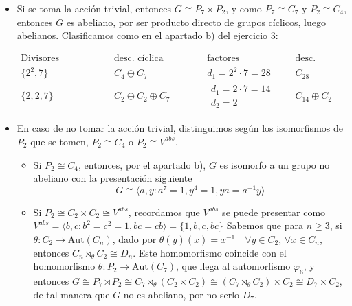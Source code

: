\documentclass[12pt]{article}
\newcommand{\Aut}{\text{Aut}}
\begin{document}
\begin{ejercicio}[2 puntos]
\begin{enumerate}[label=(\alph*)]
            \begin{itemize}
                \item Si se toma la acción trivial, entonces $G \cong P_7 \times P_2$, y como $P_7 \cong C_7$ y $P_2 \cong C_4$, entonces $G$ es abeliano, por ser producto directo de grupos cíclicos, luego abelianos. Clasificamos como en el apartado b) del ejercicio 3:
                
                \begin{equation*}
                    \begin{array}{c|c|c|c}
                        \text{Divisores elementales} & \text{desc. cíclica primaria} & \text{factores invariantes} & \text{desc. cíclica} \\
                        \hline
                        \{2^2, 7\} & C_4 \oplus C_{7} & d_1 = 2^2\cdot 7 = 28 & C_{28} \\
                        \hline
                        \{2, 2, 7\} & C_2\oplus C_2\oplus C_7 & \begin{array}{c}
                                d_1 = 2 \cdot 7 = 14 \\
                                d_2 = 2
                        \end{array}& C_{14}\oplus C_2
                    \end{array}
                \end{equation*}
                \item En caso de no tomar la acción trivial, distinguimos según los isomorfismos de $P_2$ que se tomen, $P_2 \cong C_4$ o $P_2 \cong V^{abs}$.
                \begin{itemize}
                    \item Si $P_2 \cong C_4$, entonces, por el apartado b), $G$ es isomorfo a un grupo no abeliano con la presentación siguiente $$G \cong \langle a,y : a^7 = 1,  y^4 = 1, ya = a^{-1}y \rangle$$
                    \item Si $P_2 \cong C_2 \times C_2 \cong V^{abs}$, recordamos que $V^{abs}$ se puede presentar como $V^{abs} = \langle b,c : b^2 = c^2 = 1, bc = cb \rangle = \{1, b, c, bc\}$
                    Sabemos que para $n \geqslant 3$, si $\theta : C_2 \to \Aut(C_n)$, dado por $\theta(y)(x) = x^{-1} \quad \forall y \in C_2$, $\forall x \in C_n$, entonces $C_n \rtimes_{\theta} C_2 \cong D_n$.
                    Este homomorfismo coincide con el homomorfismo $\theta: P_2 \to \Aut(C_7)$, que llega al automorfismo $\varphi_6$, y entonces $G \cong P_7 \rtimes P_2 \cong C_7 \rtimes_{\theta} (C_2 \times C_2) \cong (C_7 \rtimes_{\theta} C_2) \times C_2 \cong 
                    D_7 \times C_2$, de tal manera que $G$ no es abeliano, por no serlo $D_7$. \\


\end{itemize}
\end{itemize}
\end{enumerate}
\end{ejercicio}
\end{document}
